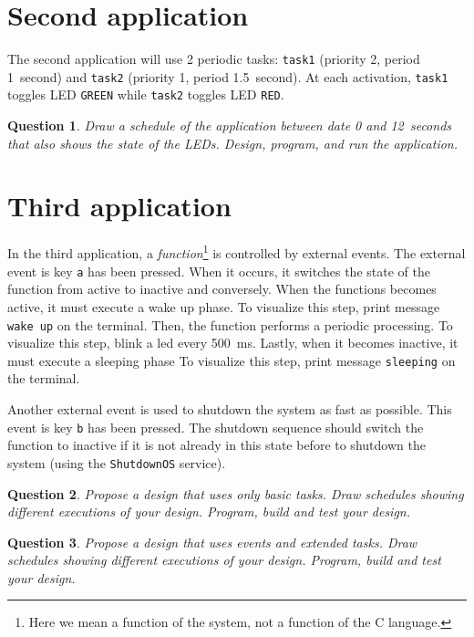 \documentclass[11pt]{report}
\newtheorem{ex}{Question}
\begin{document}
\section{Second application}

The second application will use 2 periodic tasks: \texttt{task1} (priority 2, period \SI{1}{second}) and \texttt{task2} (priority 1, period \SI{1.5}{second}).
At each activation, \texttt{task1} toggles LED \verb-GREEN- while \texttt{task2} toggles LED \verb-RED-.

\begin{ex}
  Draw a schedule of the application between date \num{0} and \SI{12}{seconds} that also shows the state of the LEDs.
  Design, program, and run the application.
\end{ex}


\section{Third application}

In the third application, a \textit{function}\footnote{Here we mean a function of the system, not a function of the C language.} is controlled by external events.
The external event is key \verb-a- has been pressed.
When it occurs, it switches the state of the function from active to inactive and conversely.
When the functions becomes active, it must execute a wake up phase.
To visualize this step, print message \verb-wake up- on the terminal.
Then, the function performs a periodic processing.
To visualize this step, blink a led every \SI{500}{\milli\second}.
Lastly, when it becomes inactive, it must execute a sleeping phase
To visualize this step, print message \verb-sleeping- on the terminal.

Another external event is used to shutdown the system as fast as possible.
This event is key \verb-b- has been pressed.
The shutdown sequence should switch the function to inactive if it is not already in this state before to shutdown the system (using the \texttt{ShutdownOS} service).

\begin{ex}
    Propose a design that uses only basic tasks.
    Draw schedules showing different executions of your design.
    Program, build and test your design.
\end{ex}

\begin{ex}
    Propose a design that uses events and extended tasks.
    Draw schedules showing different executions of your design.
    Program, build and test your design.
\end{ex}
\end{document}
